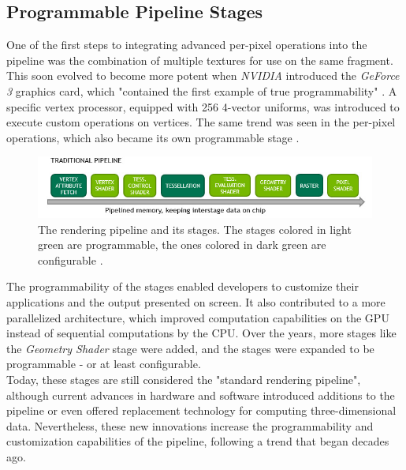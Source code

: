 \subsection*{Programmable Pipeline Stages}
 
One of the first steps to integrating advanced per-pixel operations into the pipeline was the combination of
multiple textures for use on the same fragment. This soon evolved to become more potent when \emph{NVIDIA} 
introduced the \emph{GeForce 3} graphics card, which "contained the first example of true programmability" 
\cite{KhronosProgramibility2024}. A specific vertex processor, equipped with 256 4-vector uniforms, was 
introduced to execute custom operations on vertices. The same trend was seen in the per-pixel operations, 
which also became its own programmable stage \cite{KhronosProgramibility2024}. \\

\begin{figure}[h]
    \centering
    \includegraphics[width=\linewidth]{images/graphics/traditional-rendering-pipeline.jpg}
    \caption{The rendering pipeline and its stages. The stages colored in light green are programmable, 
    the ones colored in dark green are configurable \cite{Kubisch2018}.}
    \label{fig:traditional-rendering-pipeline}
\end{figure}

\noindent
The programmability of the stages enabled developers to customize their applications and the output presented 
on screen. It also contributed to a more parallelized architecture, which improved computation capabilities on 
the \ac{GPU} instead of sequential computations by the \ac{CPU}. Over the years, more stages like the 
\emph{Geometry Shader} stage were added, and the stages were expanded to be programmable - or at least configurable. \\

\noindent
Today, these stages are still considered the "standard rendering pipeline", although current advances in hardware 
and software introduced additions to the pipeline or even offered replacement technology for computing 
three-dimensional data. Nevertheless, these new innovations increase the programmability and customization capabilities 
of the pipeline, following a trend that began decades ago.


